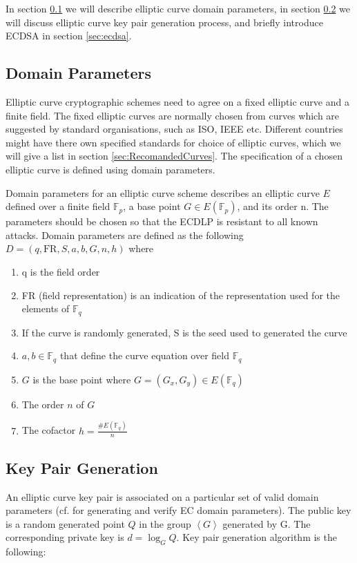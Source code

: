 In section \ref{domainParameters} we will describe elliptic curve domain parameters, in section \ref{secKeyPairGen} we will discuss elliptic curve key pair generation process, and briefly introduce ECDSA in section \ref{sec:ecdsa}.

\subsection{Domain Parameters} \label{domainParameters}
Elliptic curve cryptographic schemes need to agree on a fixed elliptic curve and a finite field. The fixed elliptic curves are normally chosen from curves which are suggested by standard organisations, such as ISO, IEEE etc. Different countries might have there own specified standards for choice of elliptic curves, which we will give a list in section \ref{sec:RecomandedCurves}. The specification of a chosen elliptic curve is defined using domain parameters. 

Domain parameters for an elliptic curve scheme describes an elliptic curve $E$ defined over a finite field $\mathbb{F}_p$, a base point $G \in E\left( \mathbb{F}_p \right) $, and its order n. The parameters should be chosen so that the ECDLP is resistant to all known attacks. Domain parameters are defined as the following $D=(q,\text{FR},S,a,b,G,n,h)$ where
\begin{enumerate}
	\item q is the field order
	\item FR (field representation) is an indication of the representation used for the elements of $\mathbb{F}_q$
	\item If the curve is randomly generated, S is the seed used to generated the curve
	\item $a,b \in \mathbb{F}_q$ that define the curve equation over field $\mathbb{F}_q$
	\item $G$ is the base point where $G = \left( G_x,G_y \right) \in E(\mathbb{F}_q)$
	\item The order $n$ of $G$
	\item The cofactor $h = \frac{\#E(\mathbb{F}_q) }{n}$
\end{enumerate}

\subsection{Key Pair Generation}\label{secKeyPairGen}
An elliptic curve key pair is associated on a particular set of valid domain parameters (cf. \cite{hankerson2006guide} for generating and verify EC domain parameters). The public key is a random generated point $Q$ in the group $\left\langle G \right\rangle $ generated by G. The corresponding private key is $d = \log_GQ$. Key pair generation algorithm is the following:
 
